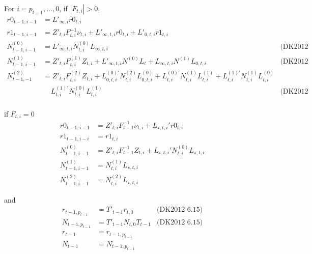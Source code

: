 \documentclass{article}
\begin{document}
For $i = p_{t-1},\ldots,0$, if $|F_{t,i}| > 0$,
\begin{align*}
  
  r0_{t-1,i-1} &= L'_{\infty,i}r0_{t,i} \\
  r1_{t-1,i-1} &= Z'_{t,i}F^{-1}_{t,i}\nu_{t,i} +
                 L'_{\infty,t,i}r0_{t,i} + L'_{0,t,i}r1_{t,i} \\
  N^{(0)}_{t-1,i-1} &= L'_{\infty,t,i}N^{(0)}_{t,i}L_{\infty,t,i} & \mbox{(DK2012 5.26)}\\
  N^{(1)}_{t-1,i-1} &= Z'_{t,i}F^{(1)}_{t,i}Z_{t,i} + L'_{\infty,t,i}N^{(0)}L_t
                  +L_{\infty,t,i}N^{(1)}L_{0,t,i}
                  & \mbox{(DK2012 5.29)}\\
  N^{(2)}_{t-1,-1} &= Z'_{t,i}F^{(2)}_{t,i}Z_{t,i} + L^{(0)'}_{0,t,i}N^{(2)}_{t,i}L^{(0)}_{0,t,i} +
                  L^{(0)'}_{t,i}N^{(1)}_{t,i}L^{(1)}_{t,i} +
                  L^{(1)'}_{t,i}N^{(1)}_{t,i}L^{(0)}_{t,i} \\
  &\;\;\;\;  L^{(1)'}_{t,i}N^{(0)}_{t,i}L^{(1)}_{t,i} & \mbox{(DK2012 5.29)}\\
\end{align*}

if $F_{t,i} = 0$
\begin{align*}
  r0_{t-1,i-1} &= Z'_{t,i}F^{-1}_{t-1}\nu_{t,i} + L_{\star, t, i}'r0_{t,i} \\
  r1_{t-1,i-i} &= r1_{t,i}\\
  N^{(0)}_{t-1,i-1} &= Z'_{t,i}F^{-1}_{t-1}Z_{t,i} + L_{\star, t, i}'N^{(0)}_{t,i}L_{\star, t, i}\\
  N^{(1)}_{t-1,i-1} &= N^{(1)}_{t,i}L_{\star, t, i}\\
  N^{(2)}_{t-1,i-1} &= N^{(2)}_{t,i}L_{\star, t, i}
\end{align*}

and
\begin{align*}
  r_{t-1,p_{t-1}} &= T'_{t-1}r_{t,0} & \mbox{(DK2012 6.15)}\\
  N_{t-1,p_{t-1}} &= T'_{t-1}N_{t,0}T_{t-1}  & \mbox{(DK2012 6.15)}\\
  r_{t-1} &= r_{t-1, p_{t-1}}\\
  N_{t-1} &= N_{t-1, p_{t-1}}\\
\end{align*}
\end{document}
